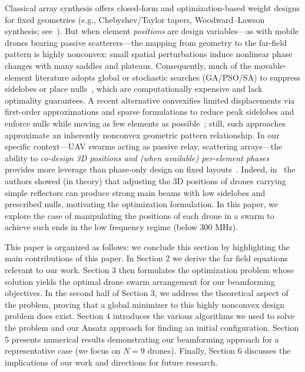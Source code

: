 \documentclass[11pt,letterpaper]{article}
\theoremstyle{definition}
\theoremstyle{plain}
\begin{document}
Classical array synthesis offers closed-form and optimization-based weight designs for fixed geometries (e.g., Chebyshev/Taylor tapers, Woodward–Lawson synthesis; see~\cite{Dolph1946,Taylor1955,Mailloux2017_PhasedArrayBook}). But when element \emph{positions} are design variables—as with mobile drones bearing passive scatterers—the mapping from geometry to the far-field pattern is highly nonconvex: small spatial perturbations induce nonlinear phase changes with many saddles and plateaus. Consequently, much of the movable-element literature adopts global or stochastic searches (GA/PSO/SA) to suppress sidelobes or place nulls~\cite{Haupt1994,RobinsonRahmatSamii2004}, which are computationally expensive and lack optimality guarantees. A recent alternative convexifies limited displacements via first-order approximations and sparse formulations to reduce peak sidelobes and enforce nulls while moving as few elements as possible~\cite{Abdelhay_2025}; still, such approaches approximate an inherently nonconvex geometric pattern relationship. In our specific context—UAV swarms acting as passive relay, scattering arrays—the ability to \emph{co-design 3D positions and (when available) per-element phases} provides more leverage than phase-only design on fixed layouts~\cite{Zarifi2010,Onofrei2020}. Indeed, in~\cite{Onofrei2020} the authors showed (in theory) that adjusting the 3D positions of drones carrying simple reflectors can produce strong main beams with low sidelobes and prescribed nulls, motivating the optimization formulation. In this paper, we explore the case of manipulating the positions of each drone in a swarm to achieve such ends in the low frequency regime (below $300$ MHz).

This paper is organized as follows: we conclude this section by highlighting the main contributions of this paper. In Section 2 we derive the far field equations relevant to our work.  Section 3 then formulates the optimization problem whose solution yields the optimal drone swarm arrangement for our beamforming objectives.  In the second half of Section 3, we address the theoretical aspect of the problem, proving that a global minimizer to this highly nonconvex design problem does exist.  Section 4 introduces the various algorithms we used to solve the problem and our Ansatz approach for finding an initial configuration. Section 5 presents numerical results demonstrating our beamforming approach for a representative case (we focus on $N=9$ drones).  Finally, Section 6 discusses the implications of our work and directions for future research.
\end{document}
